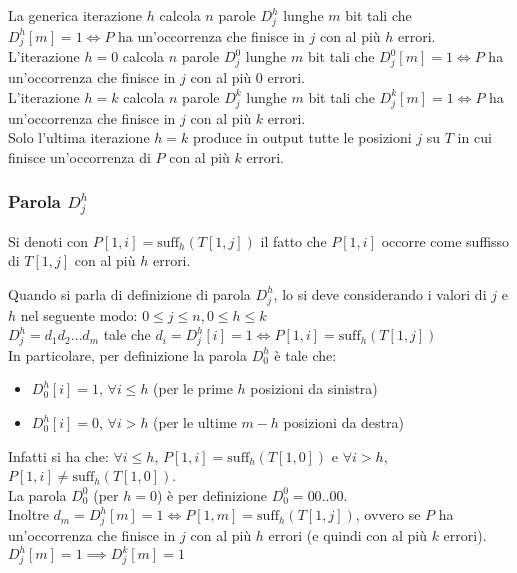 La generica iterazione $h$ calcola $n$ parole $D_j^h$ lunghe $m$ bit tali che $D_j^h[m] = 1 \iff P$ ha un’occorrenza che finisce in $j$ con al più $h $ errori.  \\
L’iterazione $h=0$ calcola $n$ parole $D_j^0$ lunghe $m$ bit tali che $D_j^0[m] = 1 \iff P$ ha un’occorrenza che finisce in $j$ con al più $0$ errori. \\
L’iterazione $h=k$ calcola $n$ parole $D_j^k$ lunghe $m$ bit tali che $D_j^k[m] = 1 \iff P$ ha un’occorrenza che finisce in $j$ con al più $k$ errori. \\
Solo l’ultima iterazione $h=k$ produce in output tutte le posizioni $j$ su $T$ in cui finisce un’occorrenza di $P$ con al più $k$ errori.\\

\subsubsection{Parola \texorpdfstring{$D^h_j$}{}}
Si denoti con $P[1, i] = \mbox{suff}_h(T[1, j])$ il fatto che $P[1, i]$ occorre come suffisso di $T[1, j]$ con al più $h$ errori.

Quando si parla di definizione di parola $D^h_j$, lo si deve considerando i valori di $j$ e $h$ nel seguente modo: $0 \leq j \leq n, 0\leq h \leq k$\\
$D^h_j = d_1 d_2 \dots d_m$ tale che $d_i = D^h_j[i] = 1 \iff P[1, i ] = \mbox{suff}_h(T[1, j])$\\

In particolare, per definizione la parola $D^h_0$ è tale che:
\begin{itemize}
    \item $D^h_0 [i] = 1$, $\forall i \leq h$ (per le prime $h$ posizioni da sinistra) 
    \item $D^h_0[i] = 0$, $\forall i > h$ (per le ultime $m-h$ posizioni da destra)
\end{itemize}

Infatti si ha che: $\forall i \leq h$, $P[1, i] = \mbox{suff}_h(T[1,0])$ e $\forall i > h$, $P[1, i] \neq \mbox{suff}_h(T[1,0])$.\\

La parola $D^0_0$ (per $ h=0$) è per definizione $D^0_0 = 00..00$.\\

Inoltre $d_m = D^h_j[m] = 1 \iff P[1, m] = \mbox{suff}_h(T[1,j])$, ovvero se $P$ ha un’occorrenza che finisce in $j$ con al più $h$ errori (e quindi con al più $k$ errori).
$D^h_j[m] = 1 \implies D^k_j[m] = 1$

